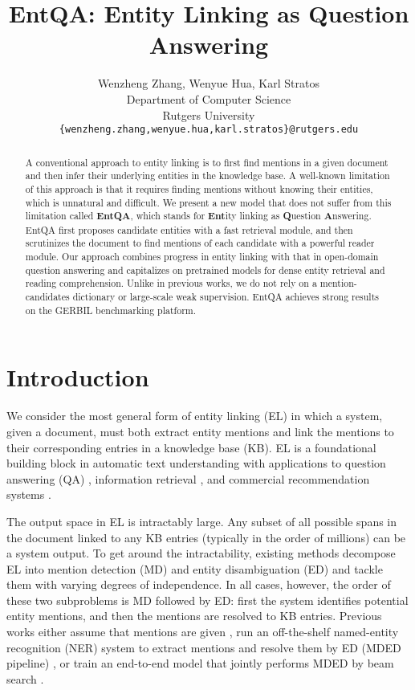 \documentclass{article} \clearpage{}\usepackage{amsmath,amssymb,amsthm,bbm}
\title{EntQA: Entity Linking as Question Answering}
\author{Wenzheng Zhang, Wenyue Hua, Karl Stratos \\
Department of Computer Science\\
Rutgers University\\
\texttt{\{wenzheng.zhang,wenyue.hua,karl.stratos\}@rutgers.edu}
}
\theoremstyle{definition}
\begin{document}
\maketitle


\begin{abstract}
  A conventional approach to entity linking is to first find mentions in a given document and then infer their underlying entities in the knowledge base.
  A well-known limitation of this approach is that it requires finding mentions without knowing their entities, which is unnatural and difficult.
  We present a new model that does not suffer from this limitation called \textbf{EntQA}, which stands for \textbf{Ent}ity linking as \textbf{Q}uestion \textbf{A}nswering.
  EntQA first proposes candidate entities with a fast retrieval module, and then scrutinizes the document to find mentions of each candidate with a powerful reader module.
  Our approach combines progress in entity linking with that in open-domain question answering and capitalizes on
  pretrained models for dense entity retrieval and reading comprehension.
  Unlike in previous works, we do not rely on a mention-candidates dictionary or large-scale weak supervision.
  EntQA achieves strong results on the GERBIL benchmarking platform.
\end{abstract}


\section{Introduction}
\label{sec:intro}

We consider the most general form of entity linking (EL) in which a system, given a document, must both extract entity mentions and link the mentions to
their corresponding entries in a knowledge base (KB).
EL is a foundational building block in automatic text understanding with applications to question answering (QA) \citep{ferrucci2012introduction},
information retrieval \citep{xiong2017word,hasibi2016exploiting,balog2013multi,reinanda2015mining}, and commercial recommendation systems \citep{yang2018collective,slawski2015}.

The output space in EL is intractably large. Any subset of all possible spans in the document linked to any KB entries (typically in the order of millions) can be a system output.
To get around the intractability, existing methods decompose EL into mention detection (MD) and entity disambiguation (ED) and tackle them with varying degrees of independence.
In all cases, however, the order of these two subproblems is MD followed by ED: first the system identifies potential entity mentions,
and then the mentions are resolved to KB entries.
Previous works either assume that mentions are given \citep{gupta2017entity},
run an off-the-shelf named-entity recognition (NER) system to extract mentions and resolve them by ED (MDED pipeline) \citep{hoffart2011robust,ling2015design,van2020rel},
or train an end-to-end model that jointly performs MDED by beam search \citep{kolitsas2018end,cao2021autoregressive}.
\end{document}
